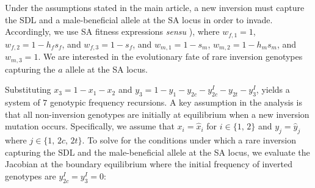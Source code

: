 \documentclass{article}
\begin{document}
Under the assumptions stated in the main article, a new inversion must capture the SDL and a male-beneficial allele at the SA locus in order to invade. Accordingly, we use SA fitness expressions {\itshape sensu} \citealt{Kidwell1977,ConnallonClark2012,Otto2011}), where $w_{f,1} = 1$, $w_{f,2} = 1 - h_f s_f$, and $w_{f,3} = 1 - s_f$, and $w_{m,1} = 1 - s_m$, $w_{m,2} = 1 - h_m s_m$, and $w_{m,3} = 1$. We are interested in the evolutionary fate of rare inversion genotypes capturing the $a$ allele at the SA locus.

Substituting $x_3 = 1 - x_1 - x_2$ and $y_3 = 1 - y_1 - y_{2c} - y^I_{2c} - y_{2t} - y^I_3$, yields a system of $7$ genotypic frequency recursions. A key assumption in the analysis is that all non-inversion genotypes are initially at equilibrium when a new inversion mutation occurs. Specifically, we assume that $x_i = \hat{x}_i$ for $i \in \{1,\,2 \}$ and $y_j = \hat{y}_j$ where $j \in \{ 1,\,2c,\,2t \}$. To solve for the conditions under which a rare inversion capturing the SDL and the male-beneficial allele at the SA locus, we evaluate the Jacobian at the boundary equilibrium where the initial frequency of inverted genotypes are $y^{I}_{2c} = y^{I}_{3} = 0$:
\end{document}

